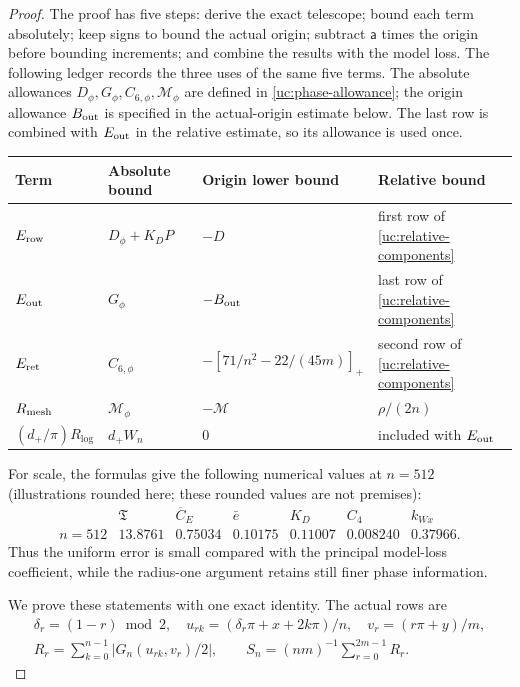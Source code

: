 \begin{proof}
The proof has five steps: derive the exact telescope; bound each term
absolutely; keep signs to bound the actual origin; subtract
$\mathsf a$ times the origin before bounding increments; and combine
the results with the model loss. The following ledger records the
three uses of the same five terms. The absolute allowances
$D_\phi,G_\phi,C_{6,\phi},\mathcal M_\phi$ are defined in
\eqref{uc:phase-allowance}; the origin allowance $B_{\rm out}$ is
specified in the actual-origin estimate below. The last row is combined with
$E_{\rm out}$ in the relative estimate, so its allowance is used once.
\begin{center}\small
\begin{tabular}{@{}llll@{}}
\toprule
Term & Absolute bound & Origin lower bound & Relative bound\\\midrule
$E_{\rm row}$ & $D_\phi+K_DP$ & $-D$ & first row of \eqref{uc:relative-components}\\
$E_{\rm out}$ & $G_\phi$ & $-B_{\rm out}$ & last row of \eqref{uc:relative-components}\\
$E_{\rm ret}$ & $C_{6,\phi}$ & $-[71/n^2-22/(45m)]_+$ & second row of \eqref{uc:relative-components}\\
$R_{\rm mesh}$ & $\mathcal M_\phi$ & $-\mathcal M$ & $\rho/(2n)$\\
$(d_+/\pi)R_{\log}$ & $d_+W_n$ & $0$ & included with $E_{\rm out}$\\
\bottomrule
\end{tabular}
\end{center}
For scale, the formulas give the following numerical values at
$n=512$ (illustrations rounded here; these rounded values are not
premises):
\[
\begin{array}{c|rrrrrr}
 &\mathfrak T&\overline C_E&\bar e&K_D&C_4&k_{Wx}\\\hline
 n=512&13.8761&0.75034&0.10175&0.11007&0.008240&0.37966.
\end{array}
\]
Thus the uniform error is small compared with the principal model-loss
coefficient, while the radius-one argument retains still finer phase
information.

We prove these statements with one exact identity. The actual rows are
\[
 \begin{gathered}
 \delta_r=(1-r)\bmod2,\quad
 u_{rk}=(\delta_r\pi+x+2k\pi)/n,\quad v_r=(r\pi+y)/m,\\
 R_r=\sum_{k=0}^{n-1}|G_n(u_{rk},v_r)/2|,
 \qquad S_n=(nm)^{-1}\sum_{r=0}^{2m-1}R_r.
 \end{gathered}
\]

\end{proof}
